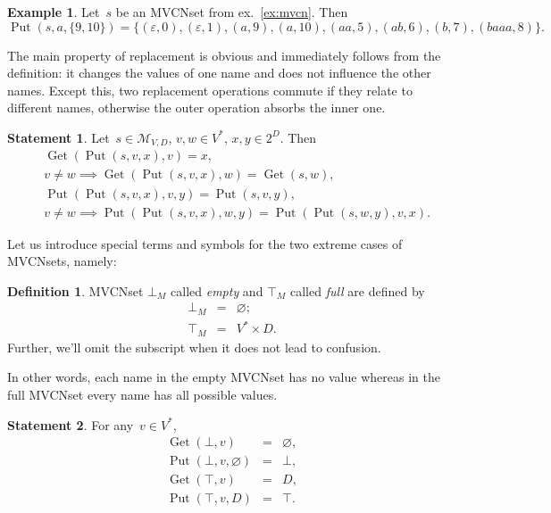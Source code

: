 \documentclass{article}
\theoremstyle{definition}
\newtheorem{Df}{Definition}
\newtheorem{St}{Statement}
\newtheorem{Ex}{Example}
\newcommand{\setcharmvcn}{M}
\newcommand{\setsymbol}[3]{\mathcal{#1}_{#2,#3}}
\newcommand{\setmvcn}[2]{\setsymbol{\setcharmvcn}{#1}{#2}}
\newcommand{\deref}{\operatorname{Get}}
\newcommand{\putval}{\operatorname{Put}}
\begin{document}
\begin{Ex}\label{ex:mvcn-replace}
Let~$s$ be an MVCNset from ex.~\ref{ex:mvcn}. Then
\[
  \putval(s, a, \{ 9, 10 \}) = \{
    (\varepsilon, 0),
    (\varepsilon, 1),
    (a,           9),
    (a,           10),
    (aa,          5),
    (ab,          6),
    (b,           7),
    (baaa,        8)
  \} .
\]
\end{Ex}

The main property of replacement is obvious and immediately follows from the
definition: it changes the values of one name and does not influence the other
names. Except this, two replacement operations commute if they
relate to different names, otherwise the outer operation absorbs the inner one.
\begin{St}\label{st:mvcn-replace-deref}
Let~$s \in \setmvcn{V}{D}$, $v, w \in V^\ast$, $x, y \in 2^D$. Then
\begin{eqnarray*}
  & \deref(\putval(s, v, x), v) = x , \\
  & v \neq w \implies \deref(\putval(s, v, x), w) = \deref(s, w) , \\
  & \putval(\putval(s, v, x), v, y) = \putval(s, v, y) , \\
  & v \neq w \implies \putval(\putval(s, v, x), w, y) = \putval(\putval(s, w, y), v, x) .
\end{eqnarray*}
\end{St}

Let us introduce special terms and symbols for the two extreme cases of
MVCNsets, namely:
\begin{Df}\label{df:mvcn-extreme}
MVCNset $\bot_\setcharmvcn$ called \emph{empty} and $\top_\setcharmvcn$ called
\emph{full} are defined by
\begin{eqnarray*}
  \bot_\setcharmvcn &  = &  \varnothing ; \\
  \top_\setcharmvcn &  = &  V^\ast \times D .
\end{eqnarray*}
Further, we'll omit the subscript when it does not lead to confusion.
\end{Df}

In other words, each name in the empty MVCNset has no value whereas in the
full MVCNset every name has all possible values.
\begin{St}\label{st:mvcn-extreme-deref}
For any~$v\in V^\ast$,
\begin{eqnarray*}
  \deref(\bot, v) & = & \varnothing, \\
  \putval(\bot, v, \varnothing) & = & \bot , \\
  \deref(\top, v) & = & D , \\
  \putval(\top, v, D) & = & \top .
\end{eqnarray*}
\end{St}
\end{document}
